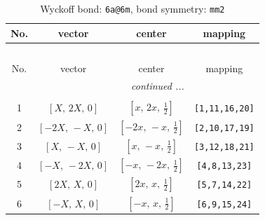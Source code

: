 \documentclass[fleqn,8pt]{jsarticle}
\begin{document}
\begin{longtable}{cccc}
\caption{Wyckoff bond: {\tt 6a@6m}, bond symmetry: {\tt mm2}}
 \\
 \hline \hline
No. & vector & center & mapping \\ \hline \endfirsthead

\multicolumn{3}{l}{\tablename\ \thetable{}} \\
 \hline \hline
No. & vector & center & mapping \\ \hline \endhead

 \hline \hline
\multicolumn{3}{r}{\footnotesize\it continued ...} \\ \endfoot

 \hline \hline
\multicolumn{3}{r}{} \\ \endlastfoot

1 & $\left[ X,\, 2 X,\, 0 \right]$ & $\left[ x,\, 2 x,\, \frac{1}{2} \right]$ & {\tt [1,11,16,20]} \\ \hline
2 & $\left[ - 2 X,\, - X,\, 0 \right]$ & $\left[ - 2 x,\, - x,\, \frac{1}{2} \right]$ & {\tt [2,10,17,19]} \\ \hline
3 & $\left[ X,\, - X,\, 0 \right]$ & $\left[ x,\, - x,\, \frac{1}{2} \right]$ & {\tt [3,12,18,21]} \\ \hline
4 & $\left[ - X,\, - 2 X,\, 0 \right]$ & $\left[ - x,\, - 2 x,\, \frac{1}{2} \right]$ & {\tt [4,8,13,23]} \\ \hline
5 & $\left[ 2 X,\, X,\, 0 \right]$ & $\left[ 2 x,\, x,\, \frac{1}{2} \right]$ & {\tt [5,7,14,22]} \\ \hline
6 & $\left[ - X,\, X,\, 0 \right]$ & $\left[ - x,\, x,\, \frac{1}{2} \right]$ & {\tt [6,9,15,24]} \\
\end{longtable}
\renewcommand{\arraystretch}{1.2}
\end{document}

